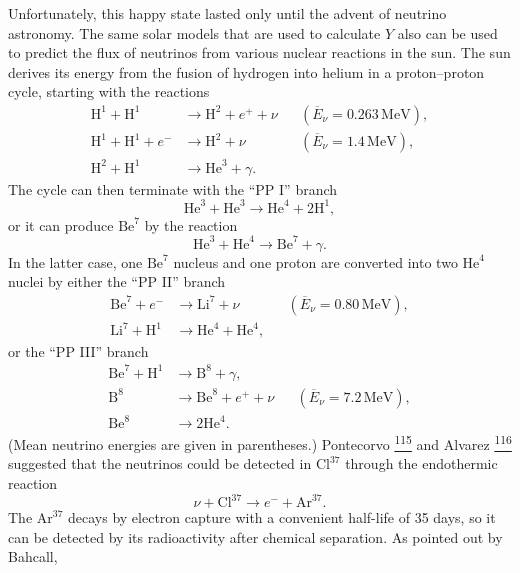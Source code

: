 Unfortunately, this happy state lasted only until the advent of neutrino
astronomy. The same solar models that are used to calculate \(Y\) also can be
used to predict the flux of neutrinos from various nuclear reactions in the
sun. The sun derives its energy from the fusion of hydrogen into helium in a
proton--proton cycle, starting with the reactions
\[
  \begin{aligned}
    \mathrm H^1+\mathrm H^1
    &\to\mathrm H^2+e^++\nu
    &&(\overline E_\nu=0.263\,\mathrm{MeV}),
    \\
    \mathrm H^1+\mathrm H^1+e^-
    &\to\mathrm H^2+\nu
    &&(\overline E_\nu=1.4\,\mathrm{MeV}),
    \\
    \mathrm H^2+\mathrm H^1
    &\to\mathrm{He}^3+\gamma.
  \end{aligned}
\]
The cycle can then terminate with the ``PP I'' branch
\[
  \mathrm{He}^3+\mathrm{He}^3\to\mathrm{He}^4+2\mathrm H^1,
\]
or it can produce \(\mathrm{Be}^7\) by the reaction
\[
  \mathrm{He}^3+\mathrm{He}^4\to\mathrm{Be}^7+\gamma.
\]
In the latter case, one \(\mathrm{Be}^7\) nucleus and one proton are
converted into two \(\mathrm{He}^4\) nuclei by either the ``PP II'' branch
\[
  \begin{aligned}
    \mathrm{Be}^7+e^-
    &\to\mathrm{Li}^7+\nu
    &&(\overline E_\nu=0.80\,\mathrm{MeV}),
    \\
    \mathrm{Li}^7+\mathrm H^1
    &\to\mathrm{He}^4+\mathrm{He}^4,
  \end{aligned}
\]
or the ``PP III'' branch
\[
  \begin{aligned}
    \mathrm{Be}^7+\mathrm H^1
    &\to\mathrm B^8+\gamma,
    \\
    \mathrm B^8
    &\to\mathrm{Be}^8+e^++\nu
    &&(\overline E_\nu=7.2\,\mathrm{MeV}),
    \\
    \mathrm{Be}^8
    &\to2\mathrm{He}^4.
  \end{aligned}
\]
(Mean neutrino energies are given in parentheses.) Pontecorvo%
\hyperref[ch15-ref-115]{\textsuperscript{115}} and Alvarez%
\hyperref[ch15-ref-116]{\textsuperscript{116}} suggested that the neutrinos
could be detected in \(\mathrm{Cl}^{37}\) through the endothermic reaction
\begin{equation}
  \nu+\mathrm{Cl}^{37}\to e^-+\mathrm{Ar}^{37}.
  \tag{15.7.37}\label{eq:15.7.37}
\end{equation}
The \(\mathrm{Ar}^{37}\) decays by electron capture with a convenient
half-life of 35 days, so it can be detected by its radioactivity after
chemical separation. As pointed out by Bahcall,%
